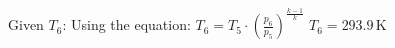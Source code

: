 Given \( T_6 \):  
Using the equation:  
\( T_6 = T_5 \cdot \left( \frac{p_6}{p_5} \right)^{\frac{k-1}{k}} \)  
\( T_6 = 293.9 \, \text{K} \)